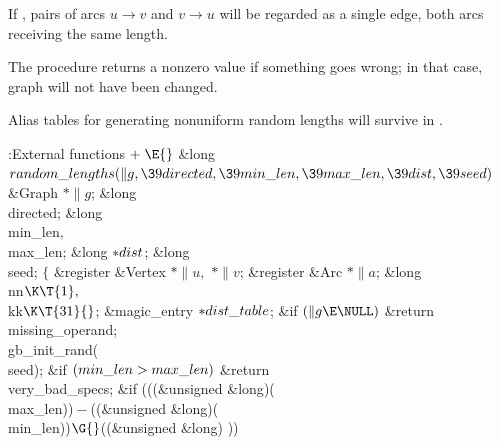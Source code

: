 If , pairs of arcs $u\to v$ and $v\to u$ will be
regarded as
a single edge, both arcs receiving the same length.

The procedure returns a nonzero value if something goes wrong; in that
case, graph  will not have been changed.

Alias tables for generating nonuniform random lengths will survive
in .

\Y\B\4:External functions\X${}\mathrel+\E{}$\6
\1\1\&{long} ${}\\{random\_lengths}(\|g,\39\\{directed},\39\\{min\_len},\39%
\\{max\_len},\39\\{dist},\39\\{seed}){}$\6
\&{Graph} ${}{*}\|g{}$;\6
\&{long} \\{directed};\6
\&{long} \\{min\_len}${},{}$ \\{max\_len};\6
\&{long} ${}{*}\\{dist}{}$;\6
\&{long} \\{seed};\2\2\6
${}\{{}$\5
\1\&{register} \&{Vertex} ${}{*}\|u,{}$ ${}{*}\|v{}$;\6
\&{register} \&{Arc} ${}{*}\|a{}$;\6
\&{long} \\{nn}${}\K\T{1},{}$ \\{kk}${}\K\T{31}{}$;\6
\&{magic\_entry} ${}{*}\\{dist\_table}{}$;\7
\&{if} ${}(\|g\E\NULL){}$\1\5
\&{return} \\{missing\_operand};\2\6
\\{gb\_init\_rand}(\\{seed});\6
\&{if} ${}(\\{min\_len}>\\{max\_len}){}$\1\5
\&{return} \\{very\_bad\_specs};\2\6
\&{if} (((\&{unsigned} \&{long})(\\{max\_len}))${}-{}$((\&{unsigned} \&{long})(%
\\{min\_len}))${}\G{}$((\&{unsigned} \&{long}) ))\1\5
